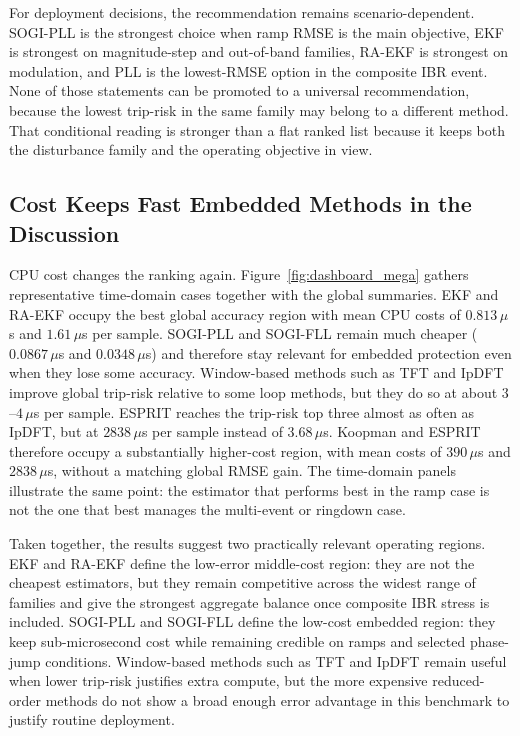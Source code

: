 For deployment decisions, the recommendation remains scenario-dependent.
SOGI-PLL is the strongest
choice when ramp RMSE is the main objective, EKF is strongest on magnitude-step
and out-of-band families, RA-EKF is strongest on modulation, and PLL is the
lowest-RMSE option in the composite IBR event. None of those statements can be
promoted to a universal recommendation, because the lowest trip-risk in the
same family may belong to a different method. That conditional reading is
stronger than a flat ranked list because it keeps both the disturbance family
and the operating objective in view.

\subsection{Cost Keeps Fast Embedded Methods in the Discussion}

CPU cost changes the ranking again. Figure~\ref{fig:dashboard_mega} gathers
representative time-domain cases together with the global summaries. EKF and
RA-EKF occupy the best global accuracy region with mean CPU costs of
$0.813\,\mu$s and $1.61\,\mu$s per sample. SOGI-PLL and SOGI-FLL remain much
cheaper ($0.0867\,\mu$s and $0.0348\,\mu$s) and therefore stay relevant for
embedded protection even when they lose some accuracy. Window-based methods
such as TFT and IpDFT improve global trip-risk relative to some loop methods,
but they do so at about $3$--$4\,\mu$s per sample. ESPRIT reaches the
trip-risk top three almost as often as IpDFT, but at $2838\,\mu$s per sample
instead of $3.68\,\mu$s. Koopman and ESPRIT therefore occupy a substantially
higher-cost region, with mean costs of $390\,\mu$s and $2838\,\mu$s, without a matching
global RMSE gain. The time-domain panels illustrate the same point: the estimator that performs best in the ramp case is not the one that best
manages the multi-event or ringdown case.

Taken together, the results suggest two practically relevant operating
regions. EKF and RA-EKF define the low-error middle-cost region: they are not
the cheapest estimators, but they remain competitive across the widest range of
families and give the strongest aggregate balance once composite IBR stress is
included. SOGI-PLL and SOGI-FLL define the low-cost embedded region: they keep
sub-microsecond cost while remaining credible on ramps and selected phase-jump
conditions. Window-based methods such as TFT and IpDFT remain useful when lower
trip-risk justifies extra compute, but the more expensive reduced-order methods
do not show a broad enough error advantage in this benchmark to justify routine
deployment.

